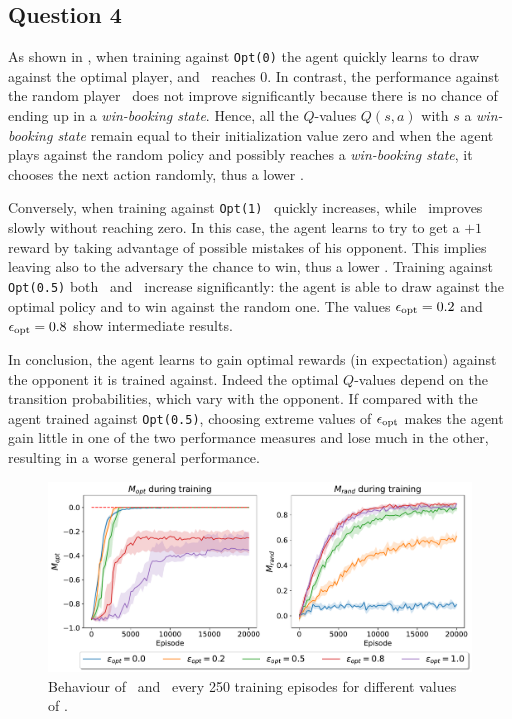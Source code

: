 \documentclass[10pt]{IEEEtran}
\begin{document}
\subsection*{Question 4}
As shown in , when training against \texttt{Opt(0)} the agent quickly learns to draw against the optimal player, and \mopt\  reaches 0. In contrast, the performance against the random player \mrand\  does not improve significantly because there is no chance of ending up in a \emph{win-booking state}. Hence, all the $Q$-values $Q(s, a)$ with $s$ a \emph{win-booking state} remain equal to their initialization value zero and when the agent plays against the random policy and possibly reaches a \emph{win-booking state}, it chooses the next action randomly, thus a lower \mrand. 

Conversely, when training against \texttt{Opt(1)} \mrand\  quickly increases, while \mopt\  improves slowly without reaching zero. In this case, the agent learns to try to get a $+1$ reward by taking advantage of possible mistakes of his opponent. This implies leaving also to the adversary the chance to win, thus a lower \mopt.
Training against \texttt{Opt(0.5)} both \mopt\  and \mrand\  increase significantly: the agent is able to draw against the optimal policy and to win against the random one. The values $\epsilon_{\text{opt}} = 0.2$ and $\epsilon_{\text{opt}} = 0.8$ show intermediate results. 

In conclusion, the agent learns to gain optimal rewards (in expectation) against the opponent it is trained against. Indeed the optimal $Q$-values depend on the transition probabilities, which vary with the opponent. If compared with the agent trained against \texttt{Opt(0.5)}, choosing extreme values of $\epsilon_{\text{opt}}$ makes the agent gain little in one of the two performance measures and lose much in the other, resulting in a worse general performance.

\begin{figure}[h]
    \centering
    \includegraphics[width=\linewidth]{code/figures/performance_epsilon_opt.pdf}
    \caption{Behaviour of \mopt\  and \mrand\  every 250 training episodes for different values of \eopt.}
    \label{plot_question4}
\end{figure}
\end{document}
